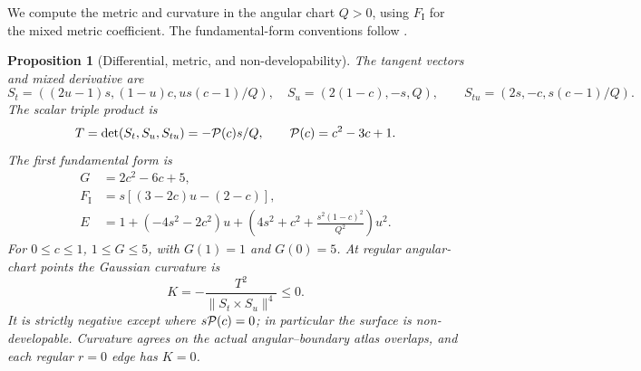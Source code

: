 \documentclass[11pt,a4paper]{article}
\newtheorem{proposition}[theorem]{Proposition}
\theoremstyle{definition}\newtheorem{definition}[theorem]{Definition}
\theoremstyle{remark}\newtheorem{remark}[theorem]{Remark}
\begin{document}
We compute the metric and curvature in the angular chart $Q>0$, using
$F_{\mathrm I}$ for the mixed metric coefficient. The fundamental-form
conventions follow \cite[Sections 2-5 and 3-3]{docarmo}.
\begin{proposition}[Differential, metric, and non-developability]\label{prop:metric}
The tangent vectors and mixed derivative are
\[
 S_t=((2u-1)s,(1-u)c,us(c-1)/Q),\quad S_u=(2(1-c),-s,Q),
 \qquad S_{tu}=(2s,-c,s(c-1)/Q).
\]
The scalar triple product is
\begin{equation}\label{eq:triple}
 T=\det(S_t,S_u,S_{tu})=-\mathcal P(c)s/Q,\qquad
 \mathcal P(c)=c^2-3c+1.
\end{equation}
The first fundamental form is
\begin{align*}
 G&=2c^2-6c+5,\\
 F_{\mathrm I}&=s[(3-2c)u-(2-c)],\\
 E&=1+(-4s^2-2c^2)u+
       \left(4s^2+c^2+\frac{s^2(1-c)^2}{Q^2}\right)u^2.
\end{align*}
For $0\leq c\leq1$, $1\leq G\leq5$, with $G(1)=1$ and $G(0)=5$.
At regular angular-chart points the Gaussian curvature is
\begin{equation}\label{eq:curvature}
 K=-\frac{T^2}{\lVert S_t\times S_u\rVert^4}\leq0.
\end{equation}
It is strictly negative except where $s\mathcal P(c)=0$; in particular the
surface is non-developable. Curvature agrees on the actual angular--boundary
atlas overlaps, and each regular $r=0$ edge has $K=0$.
\end{proposition}
\end{document}
